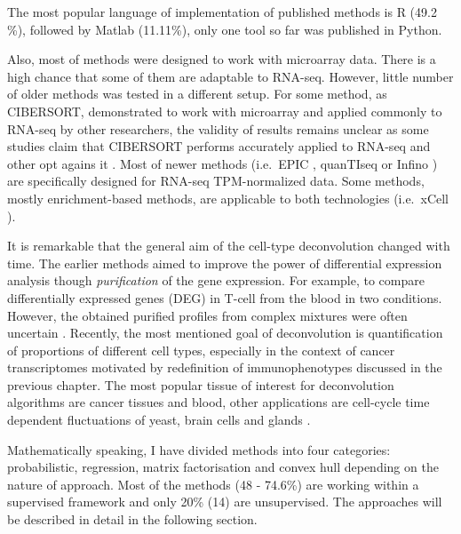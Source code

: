 \documentclass[12pt,]{book}
\theoremstyle{definition}
\theoremstyle{definition}
\theoremstyle{definition}
\theoremstyle{remark}
\begin{document}
The most popular language of implementation of published methods is R
(49.2 \%), followed by Matlab (11.11\%), only one tool so far was
published in Python.

Also, most of methods were designed to work with microarray data. There
is a high chance that some of them are adaptable to RNA-seq. However,
little number of older methods was tested in a different setup. For some
method, as CIBERSORT, demonstrated to work with microarray and applied
commonly to RNA-seq by other researchers, the validity of results
remains unclear as some studies claim that CIBERSORT performs accurately
applied to RNA-seq \citep{Thorsson2018} and other opt agains it
\citep{Li2017, Tamborero2018}. Most of newer methods (i.e.~EPIC
\citep{Racle2017}, quanTIseq \citep{Finotello2017} or Infino
\citep{Zaslavsky2017}) are specifically designed for RNA-seq
TPM-normalized data. Some methods, mostly enrichment-based methods, are
applicable to both technologies (i.e.~xCell \citep{Aran2017}).

It is remarkable that the general aim of the cell-type deconvolution
changed with time. The earlier methods aimed to improve the power of
differential expression analysis though \emph{purification} of the gene
expression. For example, to compare differentially expressed genes (DEG)
in T-cell from the blood in two conditions. However, the obtained
purified profiles from complex mixtures were often uncertain
\citep{Onuchic2016}. Recently, the most mentioned goal of deconvolution
is quantification of proportions of different cell types, especially in
the context of cancer transcriptomes motivated by redefinition of
immunophenotypes discussed in the previous chapter. The most popular
tissue of interest for deconvolution algorithms are cancer tissues and
blood, other applications are cell-cycle time dependent fluctuations of
yeast, brain cells and glands .

Mathematically speaking, I have divided methods into four categories:
probabilistic, regression, matrix factorisation and convex hull
depending on the nature of approach. Most of the methods (48 - 74.6\%)
are working within a supervised framework and only 20\% (14) are
unsupervised. The approaches will be described in detail in the
following section.
\end{document}
